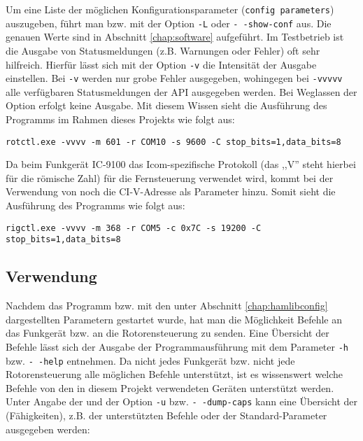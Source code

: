 Um eine Liste der möglichen Konfigurationsparameter (\texttt{config parameters}) auszugeben, führt man  bzw.  mit der Option \texttt{-L} oder \texttt{-\,-show-conf} aus. Die genauen Werte sind in Abschnitt \ref{chap:software} aufgeführt.\newpar
Im Testbetrieb ist die Ausgabe von Statusmeldungen (z.B. Warnungen oder Fehler) oft sehr hilfreich. Hierfür lässt sich mit der Option \texttt{-v} die Intensität der Ausgabe einstellen. Bei \texttt{-v} werden nur grobe Fehler ausgegeben, wohingegen bei \texttt{-vvvvv} alle verfügbaren Statusmeldungen der \ac{API} ausgegeben werden. Bei Weglassen der Option erfolgt keine Ausgabe. Mit diesem Wissen sieht die Ausführung des Programms  im Rahmen dieses Projekts wie folgt aus:

\vspace{-1em}
\begin{shaded}
	\texttt{rotctl.exe -vvvv -m 601 -r COM10 -s 9600 -C stop\_bits=1,data\_bits=8}
\end{shaded}
\vspace{-1em}

\clearpage

Da beim Funkgerät IC-9100 das Icom-spezifische Protokoll  (das ,,V'' steht hierbei für die römische Zahl) für die Fernsteuerung verwendet wird, kommt bei der Verwendung von  noch die CI-V-Adresse als Parameter hinzu. Somit sieht die Ausführung des Programms  wie folgt aus: 

\vspace{-1em}
\begin{shaded}
	\small{\texttt{rigctl.exe -vvvv -m 368 -r COM5 -c 0x7C -s 19200 -C stop\_bits=1,data\_bits=8}}
\end{shaded}

\subsection{Verwendung}

Nachdem das Programm  bzw.  mit den unter Abschnitt \ref{chap:hamlibconfig} dargestellten Parametern gestartet wurde, hat man die Möglichkeit Befehle an das Funkgerät bzw. an die Rotorensteuerung zu senden. Eine Übersicht der Befehle lässt sich der Ausgabe der Programmausführung mit dem Parameter \texttt{-h} bzw. \texttt{-\,-help} entnehmen.\newpar
Da nicht jedes Funkgerät bzw. nicht jede Rotorensteuerung alle möglichen Befehle unterstützt, ist es wissenswert welche Befehle von den in diesem Projekt verwendeten Geräten unterstützt werden. Unter Angabe der  und der Option \texttt{-u} bzw. \texttt{-\,-dump-caps} kann eine Übersicht der  (Fähigkeiten), z.B. der unterstützten Befehle oder der Standard-Parameter ausgegeben werden:

